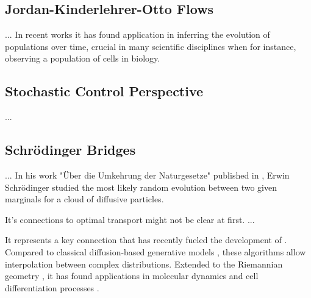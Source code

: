 \subsection{Jordan-Kinderlehrer-Otto Flows} \label{sec:background_jko}

...
In recent works \citep{bunne2022proximal, alvarez2021optimizing, mokrov2021large, benamou2016augmented} it has found application in inferring the evolution of populations over time, crucial in many scientific disciplines when for instance, observing a population of cells in biology.

\subsection{Stochastic Control Perspective} \label{sec:background_control}

...

\subsection{Schr{\"o}dinger Bridges} \label{sec:background_sb}

...
In his work "{\"U}ber die Umkehrung der Naturgesetze" published in \citeyear{schrodinger1931umkehrung}, Erwin Schr{\"o}dinger studied the most likely random evolution between two given marginals for a cloud of diffusive particles.

It's connections to optimal transport might not be clear at first. ...

It represents a key connection that has recently fueled the development of  \citep{de2021diffusion, chen2021stochastic, bunne2022recovering, liu2022deep}. Compared to classical diffusion-based generative models \citep{daniels2021score, song2020score}, these algorithms allow interpolation between complex distributions. Extended to the Riemannian geometry \citep{thornton2022riemannian, de2022riemannian}, it has found applications in molecular dynamics \citep{holdijk2022path, somnath2023aligned} and cell differentiation processes \citep{vargas2021solving, bunne2022recovering, tong2023conditional}.

